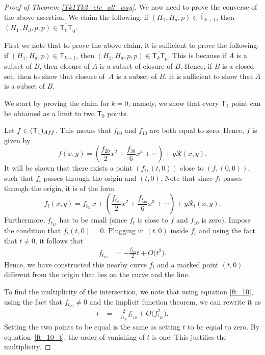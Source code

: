 \documentclass[11pt]{article}
\numberwithin{equation}{section}
\begin{document}
\begin{proof}[Proof of Theorem \ref{Tk1Tk2_etc_alt_way}]
We now need to prove the converse of the above assertion.
We claim the following: if $(H_1, H_d, p) \in \overline{\mathsf{T}}_{k+1}$,
then $(H_1, H_d, p, p) \in \overline{\mathsf{T}_{k} \mathsf{T}}_0$.

First we note that to prove the above claim, it is sufficient to prove the following:
if $(H_1, H_d, p) \in \mathsf{T}_{k+1}$,
then $(H_1, H_d, p, p) \in \overline{\mathsf{T}_{k} \mathsf{T}}_0$.
This is because if $A$ is a subset of $B$, then closure of $A$ is a subset of
closure of $B$. Hence, if $B$ is a closed set, then to show that closure of~$A$
is a subset of $B$, it is sufficient to show that $A$ is a subset of $B$.

We start by proving the claim for $k = 0$, namely, we show that
every $\mathsf{T}_1$ point can be obtained as a limit to two $\mathsf{T}_0$ points.

Let $f \in (\mathsf{T}_1)_{\textnormal{Aff}}$. This means that $f_{00}$ and $f_{10}$ are both equal to zero.
Hence, $f$ is given by
\[
f(x, y)  =  \left(\frac{f_{20}}{2} x^2 + \frac{f_{30}}{6} x^3 + \cdots\right) + y \mathcal{R}(x, y).
\]
It will be shown that there exists a point $(f_t, (t, 0))$ close to $(f, (0, 0))$, such that
$f_t$ passes through the origin and $(t, 0)$. Note that
since $f_t$ passes through the origin, it is of the form
\[
f_t(x, y) = f_{t_{10}}x+ \left(\frac{f_{t_{20}}}{2} x^2 + \frac{f_{t_{30}}}{6} x^3 +\cdots\right) +
y \mathcal{R}_t(x, y).
\]
Furthermore, $f_{t_{10}}$ has to be small (since $f_t$ is close to $f$ and $f_{10}$ is zero).
Impose the condition that $f_{t}(t, 0) = 0$. Plugging in $(t, 0)$ inside $f_t$ and using the fact
that $t \neq 0$, it follows that
\begin{align}
f_{t_{10}}&= -\frac{f_{t_{20}}}{2} t + O\bigl(t^2\bigr). \label{ft_10}
\end{align}
Hence, we have constructed this nearby curve $f_t$ and a marked point $(t, 0)$ different from the origin
that lies on the curve and the line.

To find the multiplicity of the intersection, we note that using equation \eqref{ft_10},
using the fact that $f_{t_{20}} \neq 0$
and the implicit function theorem, we can rewrite it as
\begin{align}
t & = -\frac{2}{f_{t_{20}}} f_{t_{10}} + O\bigl(f_{t_{10}}^2\bigr). \label{ft_10_t}
\end{align}
Setting the two points to be equal is the same as setting $t$ to be equal to zero.
By equation~\eqref{ft_10_t}, the order of vanishing of $t$ is one. This
justifies the multiplicity.


\end{proof}
\end{document}
